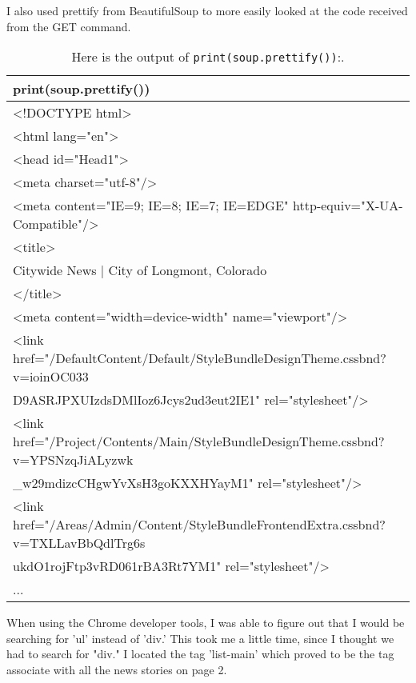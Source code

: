 \documentclass[]{article}
\newcommand{\code}[1]{\colorbox{light-gray}{\texttt{#1}}}
\begin{document}
I also used prettify from BeautifulSoup to more easily looked at the code received from the GET command.


\begin{table}[!ht]
\begin{center}
\caption{Here is the output of \code{print(soup.prettify())}:.}
\label{tab:table1}
\begin{tabular}{|l|} 
\hline
\textbf{print(soup.prettify())} \\
\hline
<!DOCTYPE html>\\
<html lang="en">\\
  <head id="Head1">\\
   <meta charset="utf-8"/>\\
   <meta content="IE=9; IE=8; IE=7; IE=EDGE" http-equiv="X-UA-Compatible"/>\\
   <title>\\
    Citywide News | City of Longmont, Colorado\\
   </title>\\
   <meta content="width=device-width" name="viewport"/>\\
   <link href="/DefaultContent/Default/StyleBundleDesignTheme.cssbnd?v=ioinOC033\\
   D9ASRJPXUIzdsDMlIoz6Jcys2ud3eut2IE1" rel="stylesheet"/>\\
   <link href="/Project/Contents/Main/StyleBundleDesignTheme.cssbnd?v=YPSNzqJiALyzwk\\
   \_w29mdizcCHgwYvXsH3goKXXHYayM1" rel="stylesheet"/>\\
   <link href="/Areas/Admin/Content/StyleBundleFrontendExtra.cssbnd?v=TXLLavBbQdlTrg6s\\
   ukdO1rojFtp3vRD061rBA3Rt7YM1" rel="stylesheet"/>\\
...\\
\hline
\end{tabular}
\end{center}
\end{table}
When using the Chrome developer tools, I was able to figure out that I would be searching for 'ul' instead of 'div.'  This took me a little time, since I thought we had to search for "div."  I located the tag 'list-main' which proved to be the tag associate with all the news stories on page 2.  
\end{document}
